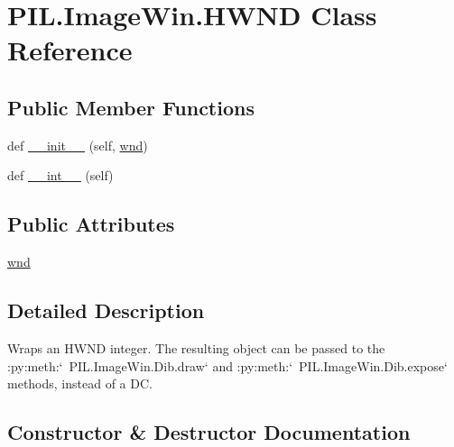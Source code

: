 \hypertarget{classPIL_1_1ImageWin_1_1HWND}{}\section{P\+I\+L.\+Image\+Win.\+H\+W\+ND Class Reference}
\label{classPIL_1_1ImageWin_1_1HWND}
\subsection*{Public Member Functions}
\begin{DoxyCompactItemize}
\item 
def \hyperlink{classPIL_1_1ImageWin_1_1HWND_a84fda0a1c39a765f3e89a94b72b0b268}{\+\_\+\+\_\+init\+\_\+\+\_\+} (self, \hyperlink{classPIL_1_1ImageWin_1_1HWND_a8bcabd2eeed7e177672d2b4e2cb072a6}{wnd})
\item 
def \hyperlink{classPIL_1_1ImageWin_1_1HWND_ad872ec944147059ffec9ce7e78b77840}{\+\_\+\+\_\+int\+\_\+\+\_\+} (self)
\end{DoxyCompactItemize}
\subsection*{Public Attributes}
\begin{DoxyCompactItemize}
\item 
\hyperlink{classPIL_1_1ImageWin_1_1HWND_a8bcabd2eeed7e177672d2b4e2cb072a6}{wnd}
\end{DoxyCompactItemize}


\subsection{Detailed Description}
\begin{DoxyVerb}Wraps an HWND integer. The resulting object can be passed to the
:py:meth:`~PIL.ImageWin.Dib.draw` and :py:meth:`~PIL.ImageWin.Dib.expose`
methods, instead of a DC.
\end{DoxyVerb}
 

\subsection{Constructor \& Destructor Documentation}
\mbox{\label{classPIL_1_1ImageWin_1_1HWND_a84fda0a1c39a765f3e89a94b72b0b268}} 
